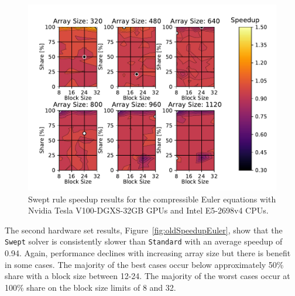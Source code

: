 \documentclass[preprints,article,accept,moreauthors,pdftex]{Definitions/mdpi}
\def\Swept{\texttt{Swept}}
\def\Standard{\texttt{Standard}}
\newcommand\fs{0.7}
\def\newCPU{Intel E5-2698v4} %
\def\newGPU{Nvidia Tesla V100-DGXS-32GB}
\begin{document}
\begin{figure}[H]
    
    \begin{center}
        \includegraphics[scale=\fs, trim={0.75cm 0.4cm 0.8cm 0.7cm},clip]{figs/speedUpeulerNew.pdf}
        \caption{Swept rule speedup results  for the compressible Euler equations with \newGPU{} GPUs and \newCPU{} CPUs.}
        \label{fig:newSpeedupEuler}
    \end{center}
\end{figure}




The second hardware set results, Figure~\ref{fig:oldSpeedupEuler}, show that the \Swept{} solver is consistently slower than \Standard{} with an average speedup of 0.94. Again, performance declines with increasing array size but there is benefit in some cases. The majority of the best cases occur below approximately 50\% share with a block size between 12-24. The majority of the worst cases occur at 100\% share on the block size limits of 8 and 32.
\end{document}
